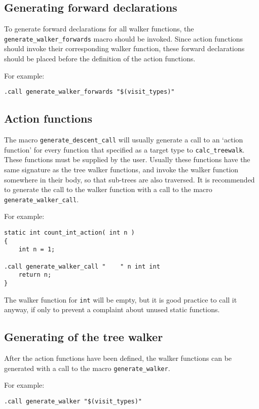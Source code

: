 \subsection{Generating forward declarations}
\begin{sloppypar}
To generate forward declarations for all walker functions, the
\verb'generate_walker_forwards' macro should be invoked.
Since action functions should invoke their corresponding walker
function, these forward declarations should be placed before the
definition of the action functions.
\end{sloppypar}
\par
For example:
\begin{verbatim}
.call generate_walker_forwards "$(visit_types)"
\end{verbatim}
\subsection{Action functions}
The macro \verb'generate_descent_call' will usually generate a call to
an `action function' for every function that specified as a target type
to \verb'calc_treewalk'. These functions must be supplied by the user.
Usually these functions have the same signature as the tree walker
functions, and invoke the walker function somewhere in their body, so that
sub-trees are also traversed. It is recommended to generate the call
to the walker function with a call to the macro \verb'generate_walker_call'.
\par
For example:
\begin{verbatim}
static int count_int_action( int n )
{
    int n = 1;

.call generate_walker_call "    " n int int
    return n;
}
\end{verbatim}
The walker function for \texttt{int} will be empty, but it is good
practice to call it anyway, if only to prevent a complaint about
unused static functions.
\subsection{Generating of the tree walker}
After the action functions have been defined, the walker functions can
be generated with a call to the macro \verb'generate_walker'.
\par
For example:
\begin{verbatim}
.call generate_walker "$(visit_types)"
\end{verbatim}

